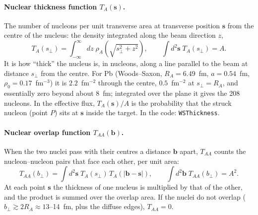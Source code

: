 \documentclass[11pt]{article}
\begin{document}
\paragraph{Nuclear thickness function $T_A(\mathbf s)$.} The number of nucleons per unit transverse
area at transverse position $\mathbf s$ from the centre of the nucleus: the density integrated
along the beam direction $z$,
\begin{equation}
  T_A(s_\perp)=\int_{-\infty}^{\infty}dz\;\rho_A\!\left(\sqrt{s_\perp^2+z^2}\right),\qquad
  \int d^2\mathbf s\;T_A(s_\perp)=A .
\end{equation}
It is how ``thick'' the nucleus is, in nucleons, along a line parallel to the beam at distance
$s_\perp$ from the centre. For Pb (Woods--Saxon, $R_A=6.49$~fm, $a=0.54$~fm, $\rho_0=0.17$~fm$^{-3}$)
it is $2.2$~fm$^{-2}$ through the centre, $0.5$~fm$^{-2}$ at $s_\perp=R_A$, and essentially zero
beyond about 8~fm; integrated over the plane it gives the 208 nucleons. In the effective flux,
$T_A(\mathbf s)/A$ is the probability that the struck nucleon (point $P$) sits at $\mathbf s$
inside the target. In the code: \texttt{WSThickness}.

\paragraph{Nuclear overlap function $T_{AA}(\mathbf b)$.} When the two nuclei pass with their centres
a distance $\mathbf b$ apart, $T_{AA}$ counts the nucleon--nucleon pairs that face each other, per
unit area:
\begin{equation}
  T_{AA}(b_\perp)=\int d^2\mathbf s\;T_A(s_\perp)\,T_A(|\mathbf b-\mathbf s|),\qquad
  \int d^2\mathbf b\;T_{AA}(b_\perp)=A^2 .
\end{equation}
At each point $\mathbf s$ the thickness of one nucleus is multiplied by that of the other, and the
product is summed over the overlap area. If the nuclei do not overlap
($b_\perp\gtrsim 2R_A\approx13$--14~fm, plus the diffuse edges), $T_{AA}=0$.
\end{document}
